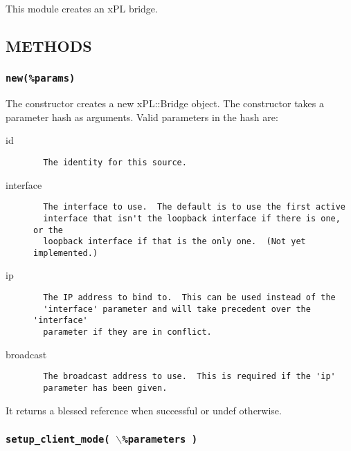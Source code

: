 This module creates an xPL bridge.

\subsection*{METHODS\label{xPL::Bridge_METHODS}}
\subsubsection*{\texttt{new(\%params)}\label{xPL::Bridge_new_params_}}


The constructor creates a new xPL::Bridge object.  The constructor
takes a parameter hash as arguments.  Valid parameters in the hash
are:

\begin{description}

\item[{id}] \mbox{}\begin{verbatim}
  The identity for this source.
\end{verbatim}

\item[{interface}] \mbox{}\begin{verbatim}
  The interface to use.  The default is to use the first active
  interface that isn't the loopback interface if there is one, or the
  loopback interface if that is the only one.  (Not yet implemented.)
\end{verbatim}

\item[{ip}] \mbox{}\begin{verbatim}
  The IP address to bind to.  This can be used instead of the
  'interface' parameter and will take precedent over the 'interface'
  parameter if they are in conflict.
\end{verbatim}

\item[{broadcast}] \mbox{}\begin{verbatim}
  The broadcast address to use.  This is required if the 'ip'
  parameter has been given.
\end{verbatim}
\end{description}


It returns a blessed reference when successful or undef otherwise.

\subsubsection*{\texttt{setup\_client\_mode( $\backslash$\%parameters )}\label{xPL::Bridge_setup_client_mode_backslash_parameters_}}


